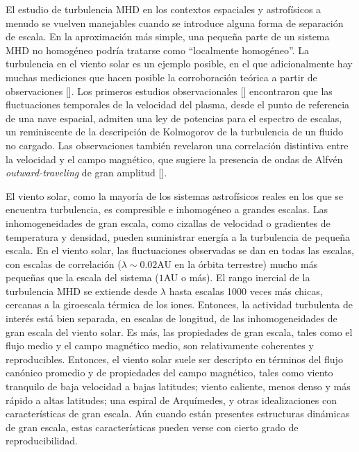 El estudio de turbulencia MHD en los contextos espaciales y
astrofísicos a menudo se vuelven manejables cuando se introduce alguna
forma de separación de escala. En la aproximación más simple, una
pequeña parte de un sistema MHD no homogéneo podría tratarse como
``localmente homogéneo''. La turbulencia en el viento solar es un
ejemplo posible, en el que adicionalmente hay muchas mediciones que
hacen posible la corroboración teórica a partir de observaciones
[\cite{tu_mhd_1995, goldstein_magnetohydrodynamic_1995}]. Los primeros
estudios observacionales [\cite{coleman_turbulence_1968}] encontraron
que las fluctuaciones temporales de la velocidad del plasma, desde el
punto de referencia de una nave espacial, admiten una ley de potencias
para el espectro de escalas, un reminiscente de la descripción de
Kolmogorov de la turbulencia de un fluido no cargado. Las
observaciones también revelaron una correlación distintiva entre la
velocidad y el campo magnético, que sugiere la presencia de ondas de
Alfv\'en \textit{outward-traveling} de gran amplitud
[\cite{coleman_turbulence_1968, belcher_large-amplitude_1971,
jokipii_turbulence_1973}].

El viento solar, como la mayoría de los sistemas astrofísicos reales
en los que se encuentra turbulencia, es compresible e inhomogéneo a
grandes escalas. Las inhomogeneidades de gran escala, como cizallas de
velocidad o gradientes de temperatura y densidad, pueden suministrar
energía a la turbulencia de pequeña escala. En el viento solar, las
fluctuaciones observadas se dan en todas las escalas, con escalas de
correlación ($\lambda \sim 0.02$AU en la órbita terrestre) mucho más
pequeñas que la escala del sistema ($1$AU o más). El rango inercial de
la turbulencia MHD se extiende desde $\lambda$ hasta escalas 1000
veces más chicas, cercanas a la giroescala térmica de los
iones. Entonces, la actividad turbulenta de interés está bien
separada, en escalas de longitud, de las inhomogeneidades de gran
escala del viento solar. Es más, las propiedades de gran escala, tales
como el flujo medio y el campo magnético medio, son relativamente
coherentes y reproducibles. Entonces, el viento solar suele ser
descripto en términos del flujo canónico promedio y de propiedades del
campo magnético, tales como viento tranquilo de baja velocidad a bajas
latitudes; viento caliente, menos denso y más rápido a altas
latitudes; una espiral de Arquímedes, y otras idealizaciones con
características de gran escala. Aún cuando están presentes estructuras
dinámicas de gran escala, estas características pueden verse con
cierto grado de reproducibilidad.

